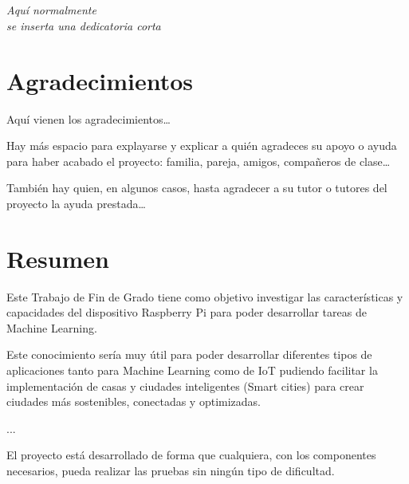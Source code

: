 \documentclass[a4paper, 12pt]{book}
\begin{document}
\chapter*{}
\begin{flushright}
\textit{Aquí normalmente \\
se inserta una dedicatoria corta \\}
\end{flushright}


\chapter*{Agradecimientos}

Aquí vienen los agradecimientos\ldots

Hay más espacio para explayarse y explicar a quién agradeces su apoyo o ayuda para
haber acabado el proyecto: familia, pareja, amigos, compañeros de clase\ldots

También hay quien, en algunos casos, hasta agradecer a su tutor o tutores del proyecto
la ayuda prestada\ldots


\chapter*{Resumen}

Este Trabajo de Fin de Grado tiene como objetivo investigar las características y capacidades del dispositivo Raspberry Pi para poder desarrollar tareas de Machine Learning.

Este conocimiento sería muy útil para poder desarrollar diferentes tipos de aplicaciones tanto para Machine Learning como de IoT pudiendo facilitar la implementación de casas y ciudades inteligentes (Smart cities) para crear ciudades más sostenibles, conectadas y optimizadas.

...

El proyecto está desarrollado de forma que cualquiera, con los componentes necesarios, pueda realizar las pruebas sin ningún tipo de dificultad.
\end{document}
